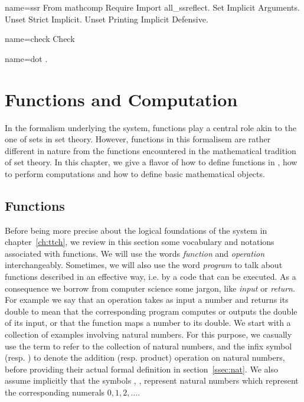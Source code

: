 \begin{coqdef}{name=ssr}
 From mathcomp Require Import all_ssreflect.
 Set Implicit Arguments.
 Unset Strict Implicit.
 Unset Printing Implicit Defensive.
\end{coqdef}
\begin{coqdef}{name=check}
Check
\end{coqdef}
\begin{coqdef}{name=dot}
.
\end{coqdef}

\chapter{Functions and Computation}\label{ch:prog}

In the formalism underlying the \Coq{} system, functions play a
central role akin to the one of sets in set theory. However, functions
in this formalisem are rather different in nature from the
functions encountered in the mathematical tradition of set theory.
In this chapter, we give a flavor of how to define functions in
\Coq{}, how to perform computations and how to define basic
mathematical objects.

\section{Functions}\label{sec:functions}
 Before being more
precise about the logical foundations of the \Coq{} system in
chapter~\ref{ch:ttch},
we review in this section some vocabulary and notations associated
with functions.
We will use the words \emph{function} and \emph{operation}
interchangeably. Sometimes, we will also use the word \emph{program}
to talk about functions described in an effective way, i.e. by a code
that can be executed. As a consequence we borrow from computer science
some jargon, like \emph{input} or \emph{return}. For example we say that
an operation takes as input a number and returns its double to mean
that the corresponding program computes or outputs the double of its
input, or that the function maps a number to its double. We start with
a collection of examples involving natural numbers. For this purpose,
we casually use the \Coq{} term  to refer to the collection of natural
numbers, and the infix symbol  \C{+} (resp. \C{*}) to denote the  addition
(resp. product) operation on natural numbers, before providing their
actual formal definition in section~\ref{ssec:nat}. We also
assume implicitly that the \Coq{} symbols  , , 
represent natural numbers which represent the corresponding numerals
$0, 1, 2, \dots$.


